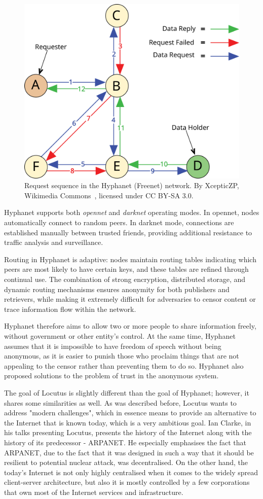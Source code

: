 \begin{figure}[ht]
  \centering
  \includegraphics[width=0.75\linewidth]{Images/freenet.png}
  \caption{Request sequence in the Hyphanet (Freenet) network. By XcepticZP, Wikimedia Commons~\cite{freenet_request_sequence_zp}, licensed under CC BY-SA 3.0.}
  \label{fig:freenet_sequence}
\end{figure}

Hyphanet supports both \emph{opennet} and \emph{darknet} operating modes. In opennet, nodes automatically connect to random peers. In darknet mode, connections are established manually between trusted friends, providing additional resistance to traffic analysis and surveillance.

Routing in Hyphanet is adaptive: nodes maintain routing tables indicating which peers are most likely to have certain keys, and these tables are refined through continual use. The combination of strong encryption, distributed storage, and dynamic routing mechanisms ensures anonymity for both publishers and retrievers, while making it extremely difficult for adversaries to censor content or trace information flow within the network.

Hyphanet therefore aims to allow two or more people to share information freely, without government or other entity’s control.
At the same time, Hyphanet assumes that it is impossible to have freedom of speech without being anonymous, as it is easier to punish those who proclaim things that are not appealing to the censor rather than preventing them to do so. Hyphanet also proposed solutions to the problem of trust in the anonymous system.

The goal of Locutus \cite{locutus} is slightly different than the goal of Hyphanet; however, it shares some similarities as well. As was described before, Locutus wants to address "modern challenges", which in essence means to provide an alternative to the Internet that is known today, which is a very ambitious goal.
Ian Clarke, in his talks presenting Locutus, presents the history of the Internet along with the history of its predecessor - ARPANET. He especially emphasises the fact that ARPANET, due to the fact that it was designed in such a way that it should be resilient to potential nuclear attack, was decentralised. On the other hand, the today's Internet is not only highly centralised when it comes to the widely spread client-server architecture, but also it is mostly controlled by a few corporations that own most of the Internet services and infrastructure.

